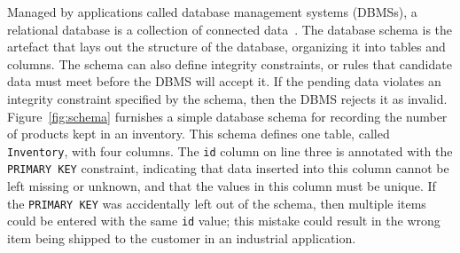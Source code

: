 



Managed by applications called database management systems (DBMSs), a relational database is a collection of connected
data~\cite{databasebook}. The database schema is the artefact that lays out the structure of the database, organizing it
into tables and columns.  The schema can also define integrity constraints, or rules that candidate data must meet
before the DBMS will accept it. If the pending data violates an integrity constraint specified by the schema, then the
DBMS rejects it as invalid.  Figure~\ref{fig:schema} furnishes a simple database schema for recording the number of
products kept in an inventory. This schema defines one table, called \texttt{Inventory}, with four columns.  The
\texttt{id} column on line three is annotated with the \texttt{PRIMARY KEY} constraint, indicating that data inserted
into this column cannot be left missing or unknown, and that the values in this column must be unique. If the
\texttt{PRIMARY KEY} was accidentally left out of the schema, then multiple items could be entered with the same
\texttt{id} value; this mistake could result in the wrong item being shipped to the customer in an industrial
application.
